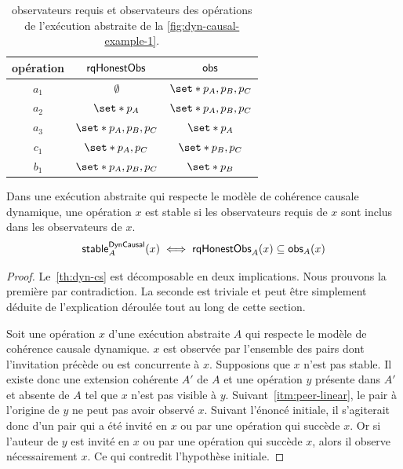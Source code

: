 \begin{table}[htb]
    \centering
    \begin{tabular}{c|c|c}
        opération & $\operatorname{\mathsf{rqHonestObs}}$ & $\operatorname{\mathsf{obs}}$ \\
        \hline
        $a_1$ & $\emptyset$ & $\set*{p_A, p_B, p_C}$ \\
        $a_2$ & $\set*{p_A}$ & $\set*{p_A, p_B, p_C}$ \\
        $a_3$ & $\set*{p_A, p_B, p_C}$ & $\set*{p_A}$ \\
        $c_1$ & $\set*{p_A, p_C}$ & $\set*{p_B, p_C}$\\
        $b_1$ & $\set*{p_A, p_B, p_C}$ & $\set*{p_B}$ \\
    \end{tabular}
    \caption[Observateurs requis]{observateurs requis et observateurs des opérations de l'exécution abstraite de la \autoref{fig:dyn-causal-example-1}.}
    \label{tab:rq-obs}
\end{table}



\begin{theorem}\label{th:dyn-cs}
Dans une exécution abstraite qui respecte le modèle de cohérence causale dynamique, une opération $x$ est stable si les observateurs requis de $x$ sont inclus dans les observateurs de $x$.
\begin{equation*}
    \operatorname{\mathsf{stable}}_A^{\operatorname{\mathsf{DynCausal}}}(x) \iff \operatorname{\mathsf{rqHonestObs}}_A(x) \subseteq \operatorname{\mathsf{obs}}_A(x)
\end{equation*}
\end{theorem}

\begin{proof}
Le~\autoref{th:dyn-cs} est décomposable en deux implications.
Nous prouvons la première par contradiction.
La seconde est triviale et peut être simplement déduite de l'explication déroulée tout au long de cette section.

Soit une opération $x$ d'une exécution abstraite $A$ qui respecte le modèle de cohérence causale dynamique.
$x$ est observée par l'ensemble des pairs dont l'invitation précède ou est concurrente à $x$.
Supposions que $x$ n'est pas stable.
Il existe donc une extension cohérente $A'$ de $A$ et une opération $y$ présente dans $A'$ et absente de $A$ tel que $x$ n'est pas visible à $y$.
Suivant~\autoref{itm:peer-linear}, le pair à l'origine de $y$ ne peut pas avoir observé $x$.
Suivant l'énoncé initiale, il s'agiterait donc d'un pair qui a été invité en $x$ ou par une opération qui succède $x$.
Or si l'auteur de $y$ est invité en $x$ ou par une opération qui succède $x$, alors il observe nécessairement $x$.
Ce qui contredit l'hypothèse initiale.
\end{proof}


